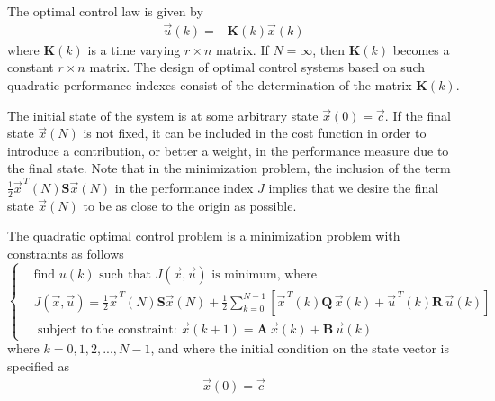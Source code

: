 \documentclass[11pt,a4paper,oneside]{book}
\numberwithin{equation}{section}
\theoremstyle{it}
\theoremstyle{definition}
\begin{document}
The optimal control law is given by 
\begin{equation}
	\begin{aligned}
		\vec{u}(k)=-\mathbf{K}(k)\vec{x}(k)
	\end{aligned}
\end{equation}
where $\mathbf{K}(k)$ is a time varying $r \times n$  matrix. If $N=\infty$, 
then $\mathbf{K}(k)$ becomes a constant $r \times n$ matrix. The design of 
optimal control systems based on such quadratic performance indexes consist of 
the determination of the matrix $\mathbf{K}(k)$.

The initial state of the system is at some arbitrary state 
$\vec{x}(0)=\vec{c}$. If the final state $\vec{x}(N)$ is not fixed, it can be 
included in the cost function in order to introduce a contribution, or better a 
weight, in the performance measure due to the final state. Note that in the 
minimization problem, the inclusion of the term 
$\frac{1}{2}\vec{x}^{\,T}(N)\mathbf{S}\vec{x}(N)$ in the performance index $J$ 
implies that we desire the final state $\vec{x}(N)$ to be as close to the 
origin as possible.
\begin{mybox}
	The quadratic optimal control problem is a minimization problem with 
	constraints as follows
	\begin{equation}\label{optimal_1}
		\left\lbrace 
		\begin{aligned}
			& \text{find $u(k)$ such that $J(\vec{x},\vec{u})$ is minimum, where}\\[6pt]
			& J(\vec{x},\vec{u}) = 
			\frac{1}{2}\vec{x}^{\,T}(N)\mathbf{S}\vec{x}(N)+\frac{1}{2}\sum_{k=0}^{N-1}\left[
			\vec{x}^{\,T}(k)\mathbf{Q}\,\vec{x}(k) + 
			\vec{u}^{\,T}(k)\mathbf{R}\,\vec{u}(k)\right]  \\[6pt]
			& \text{ subject to the constraint: } \vec{x}(k+1) = 
			\mathbf{A}\,\vec{x}(k)+\mathbf{B}\,\vec{u}(k) 
		\end{aligned}
		\right. 
	\end{equation}
	where $k=0,1,2,...,N-1$, and where the initial condition on the state 
	vector is specified as
	\begin{equation}\label{optimal_2}
		\begin{aligned}
			\vec{x}(0)=\vec{c}
		\end{aligned}
	\end{equation}
\end{mybox}
\end{document}
